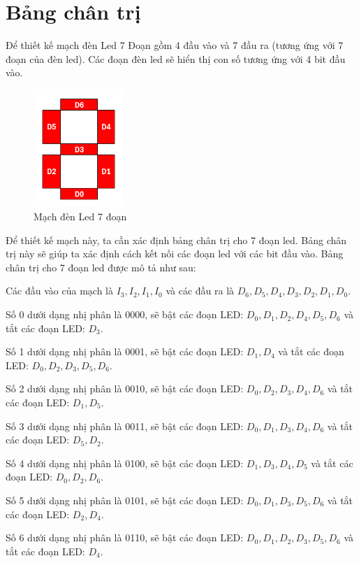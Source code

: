 \section{Bảng chân trị}
Để thiết kế mạch đèn Led 7 Đoạn gồm 4 đầu vào và 7 đầu ra (tương ứng với 7 đoạn của đèn led). Các đoạn đèn led sẽ hiển thị con số tương ứng với 4 bit đầu vào.

\begin{figure}[H]
	\centering
	\includegraphics[width=0.3\textwidth]{images/img0.PNG}
	\caption{Mạch đèn Led 7 đoạn}
	\label{fig:7segment}
\end{figure}

Để thiết kế mạch này, ta cần xác định bảng chân trị cho 7 đoạn led. Bảng chân trị này sẽ giúp ta xác định cách kết nối các đoạn led với các bit đầu vào. Bảng chân trị cho 7 đoạn led được mô tả như sau:

Các đầu vào của mạch là $I_3, I_2, I_1, I_0$ và các đầu ra là $D_6, D_5, D_4, D_3, D_2, D_1, D_0$.

Số 0 dưới dạng nhị phân là 0000, sẽ bật các đoạn LED: \(D_0, D_1, D_2, D_4, D_5, D_6\)  và tắt các đoạn LED: \(D_3\).

Số 1 dưới dạng nhị phân là 0001, sẽ bật các đoạn LED: \(D_1, D_4\) và tắt các đoạn LED: \(D_0, D_2, D_3, D_5, D_6\).

Số 2 dưới dạng nhị phân là 0010, sẽ bật các đoạn LED: \(D_0, D_2, D_3, D_4, D_6\) và tắt các đoạn LED: \(D_1, D_5\).

Số 3 dưới dạng nhị phân là 0011, sẽ bật các đoạn LED: \(D_0, D_1, D_3, D_4, D_6\) và tắt các đoạn LED: \(D_5, D_2\).

Số 4 dưới dạng nhị phân là 0100, sẽ bật các đoạn LED: \(D_1, D_3, D_4, D_5\) và tắt các đoạn LED: \(D_0, D_2, D_6\).

Số 5 dưới dạng nhị phân là 0101, sẽ bật các đoạn LED: \(D_0, D_1, D_3, D_5, D_6\) và tắt các đoạn LED: \(D_2, D_4\).

Số 6 dưới dạng nhị phân là 0110, sẽ bật các đoạn LED: \(D_0, D_1, D_2, D_3, D_5, D_6\) và tắt các đoạn LED: \(D_4\).

